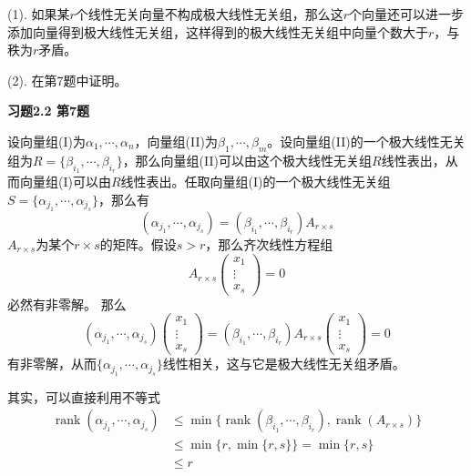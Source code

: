 (1). 如果某$r$个线性无关向量不构成极大线性无关组，那么这$r$个向量还可以进一步添加向量得到极大线性无关组，这样得到的极大线性无关组中向量个数大于$r$，与秩为$r$矛盾。

(2). 在第7题中证明。

\newpageorvspace

{\bf 习题2.2 第7题}

设向量组(I)为$\alpha_1,\cdots,\alpha_n$，向量组(II)为$\beta_1,\cdots,\beta_m$。设向量组(II)的一个极大线性无关组为$R = \{\beta_{i_1},\cdots,\beta_{i_r}\}$，那么向量组(II)可以由这个极大线性无关组$R$线性表出，从而向量组(I)可以由$R$线性表出。任取向量组(I)的一个极大线性无关组$S = \{\alpha_{j_1},\cdots,\alpha_{j_s}\}$，那么有
$$(\alpha_{j_1},\cdots,\alpha_{j_s}) = (\beta_{i_1},\cdots,\beta_{i_r})A_{r\times s}$$
$A_{r\times s}$为某个$r\times s$的矩阵。假设$s > r$，那么齐次线性方程组
$$A_{r\times s} \begin{pmatrix}
x_1 \\ \vdots \\ x_s
\end{pmatrix} = 0$$
必然有非零解。
那么
$$(\alpha_{j_1},\cdots,\alpha_{j_s})\begin{pmatrix}
x_1 \\ \vdots \\ x_s
\end{pmatrix} = (\beta_{i_1},\cdots,\beta_{i_r})A_{r\times s}\begin{pmatrix}
x_1 \\ \vdots \\ x_s
\end{pmatrix} = 0$$
有非零解，从而$\{\alpha_{j_1},\cdots,\alpha_{j_s}\}$线性相关，这与它是极大线性无关组矛盾。

其实，可以直接利用不等式
\begin{align*}
\operatorname{rank}(\alpha_{j_1},\cdots,\alpha_{j_s}) & \leqslant \min \{ \operatorname{rank}(\beta_{i_1},\cdots,\beta_{i_r}), \operatorname{rank}(A_{r\times s}) \} \\
& \leqslant \min \{ r, \min \{ r,s \} \} = \min \{ r,s \} \\
& \leqslant r
\end{align*}


